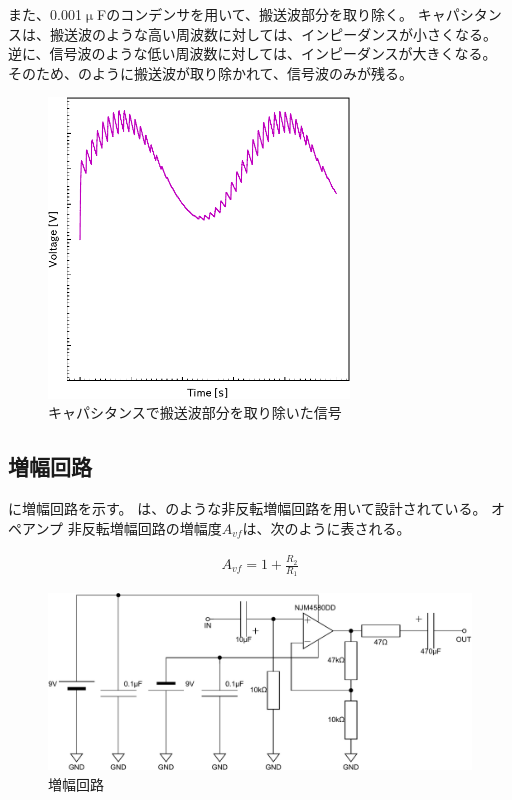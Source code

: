 \documentclass[report.tex]{subfiles}
\begin{document}
また、0.001\(\upmu\)Fのコンデンサを用いて、搬送波部分を取り除く。
キャパシタンスは、搬送波のような高い周波数に対しては、インピーダンスが小さくなる。
逆に、信号波のような低い周波数に対しては、インピーダンスが大きくなる。
そのため、のように搬送波が取り除かれて、信号波のみが残る。

\begin{figure}[H]
	\centering
	\includegraphics[width=8cm]{fig/capa.pdf}
	\caption{キャパシタンスで搬送波部分を取り除いた信号}
	\label{fig:capa}
\end{figure}

\subsection{増幅回路}

に増幅回路を示す。
は、のような非反転増幅回路を用いて設計されている。
オペアンプ
非反転増幅回路の増幅度\(A_{vf}\)は、次のように表される。

\begin{align}
	A_{vf} = 1 + \frac{R_2}{R_1}
\end{align}

\begin{figure}[H]
	\centering
	\includegraphics[width=15cm]{fig/amp.pdf}
	\caption{増幅回路}
	\label{fig:amplifier-circuit}
\end{figure}
\end{document}
